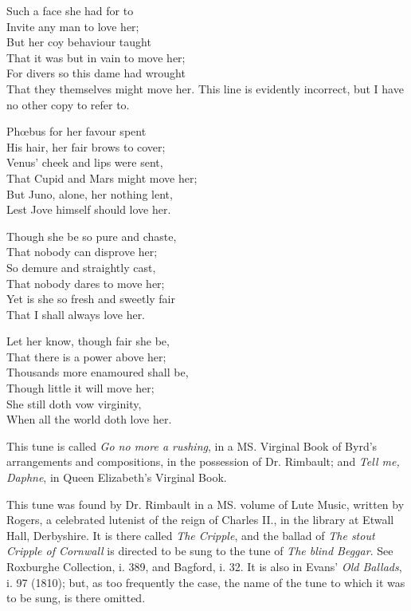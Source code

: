 \settowidth{\versewidth}{That they themselves might move}
\begin{dcverse}Such a face she had for to\\
Invite any man to love her;\\
But her coy behaviour taught\\
That it was but in vain to move her;\\
For divers so this dame had wrought\\
That they themselves might move her.\scfootnote
{This line is evidently incorrect, but I have no other copy to refer to.}


Phœbus for her favour spent\\
His hair, her fair brows to cover;\\
Venus’ cheek and lips were sent,\\
That Cupid and Mars might move her;\\
But Juno, alone, her nothing lent,\\
Lest Jove himself should love her.

Though she be so pure and chaste,\\
That nobody can disprove her;\\
So demure and straightly cast,\\
That nobody dares to move her;\\
Yet is she so fresh and sweetly fair\\
That I shall always love her.

Let her know, though fair she be,\\
That there is a power above her;\\
Thousands more enamoured shall be,\\
Though little it will move her;\\
She still doth vow virginity,\\
When all the world doth love her.
\end{dcverse}

This tune is called \textit{Go no more a rushing}, in a MS. Virginal Book of Byrd’s
arrangements and compositions, in the possession of Dr. Rimbault; and \textit{Tell me,
Daphne}, in Queen Elizabeth’s Virginal Book.




This tune was found by Dr. Rimbault in a MS. volume of Lute Music, written
by Rogers, a celebrated lutenist of the reign of Charles II., in the library at
Etwall Hall, Derbyshire. It is there called \textit{The Cripple}, and the ballad of
\textit{The stout Cripple of Cornwall} is directed to be sung to the tune of \textit{The blind
Beggar}. See Roxburghe Collection, i. 389, and Bagford, i. 32. It is also in
Evans’ \textit{Old Ballads}, i. 97 (1810); but, as too frequently the case, the name of
the tune to which it was to be sung, is there omitted.
\pagebreak

